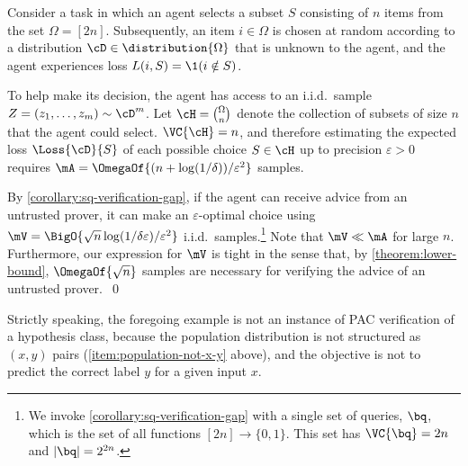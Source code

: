 \begin{example}
	Consider a task in which an agent selects a subset $S$ consisting of $n$ items from the set $\Omega = [2n]$. Subsequently, an item $i \in \Omega$ is chosen at random according to a distribution $\cD \in \distribution{\Omega}$ that is unknown to the agent, and the agent experiences loss $L(i,S) = \1(i \notin S)$.
	
	To help make its decision, the agent has access to an i.i.d.\ sample $Z = (z_1,\dots,z_m) \sim \cD^m$. Let $\cH = \binom{\Omega}{n}$ denote the collection of subsets of size $n$ that the agent could select. $\VC{\cH} = n$, and therefore estimating the expected loss $\Loss{\cD}{S}$ of each possible choice $S \in \cH$ up to precision $\varepsilon > 0$ requires $\mA = \OmegaOf{(n + \log(1/\delta))/\varepsilon^2}$ samples.
	
	By \cref{corollary:sq-verification-gap}, if the agent can receive advice from an untrusted prover, it can make an $\varepsilon$-optimal choice using $\mV = \BigO{\sqrt{n}\log(1/\delta\varepsilon)/\varepsilon^2}$ i.i.d.\ samples.\footnote{%
		We invoke \cref{corollary:sq-verification-gap} with a single set of queries, $\bq$, which is the set of all functions $[2n] \to \{0,1\}$. This set has $\VC{\bq} = 2n$ and $|\bq| = 2^{2n}$.
	} Note that $\mV \ll \mA$ for large $n$. Furthermore, our expression for $\mV$ is tight in the sense that, by \cref{theorem:lower-bound}, $\OmegaOf{\sqrt{n}}$ samples are necessary for verifying the advice of an untrusted prover.~\qed
\end{example}

Strictly speaking, the foregoing example is not an instance of PAC verification of a hypothesis class, because the population distribution is not structured as $(x,y)$ pairs (\cref{item:population-not-x-y} above), and the objective is not to predict the correct label $y$ for a given input $x$. 

